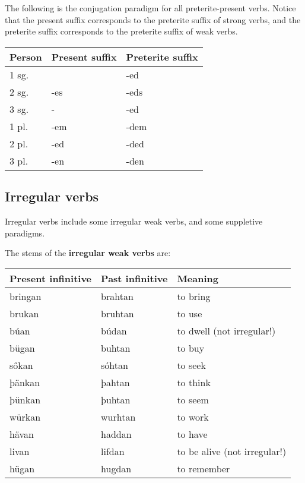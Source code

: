 The following is the conjugation paradigm for all preterite-present verbs. Notice that the present suffix corresponds to the preterite suffix of strong verbs, and the preterite suffix corresponds to the preterite suffix of weak verbs.

\begin{center}
\begin{tabular}{lll}
Person & Present suffix & Preterite suffix \\
\hline
1 sg. &     & -ed \\
2 sg. & -es & -eds \\
3 sg. & -   & -ed \\
1 pl. & -em & -dem \\
2 pl. & -ed & -ded \\
3 pl. & -en & -den \\
\end{tabular}
\end{center}

\subsection{Irregular verbs}

Irregular verbs include some irregular weak verbs, and some suppletive paradigms.

The stems of the \textbf{irregular weak verbs} are:

\begin{center}
\begin{tabular}{lll}
Present infinitive & Past infinitive & Meaning \\
\hline
bringan & brahtan & to bring \\
brukan  & bruhtan & to use   \\
búan    & búdan  & to dwell (not irregular!) \\
\hline
bügan  & buhtan  & to buy   \\
sőkan  & sóhtan  & to seek  \\
þänkan & þahtan  & to think \\
þünkan & þuhtan  & to seem  \\
würkan & wurhtan & to work  \\
\hline
hävan & haddan & to have \\
livan & lifdan & to be alive (not irregular!) \\
hügan & hugdan & to remember \\
\end{tabular}
\end{center}

